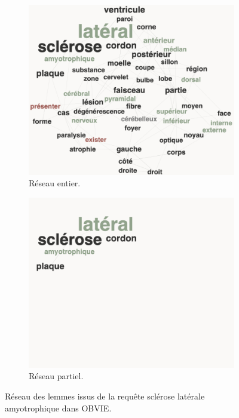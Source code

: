 \begin{figure}[h]
	\centering
	\begin{subfigure}{.5\textwidth}
		\centering
		\includegraphics[width=.9\linewidth]{img/reseau_SLA.png}
		\caption{Réseau entier.}
		\label{fig:reseau_SLA}
	\end{subfigure}%
	\begin{subfigure}{.5\textwidth}
		\centering
		\includegraphics[width=.9\linewidth]{img/reseau_SLA_mini.png}
		\caption{Réseau partiel.}
		\label{fig:reseau_SLA_mini}
	\end{subfigure}
	\caption{Réseau des lemmes issus de la requête \og{}sclérose latérale amyotrophique\fg{} dans \textsc{OBVIE}.}
	\label{fig:reseaux_SLA}
\end{figure}

